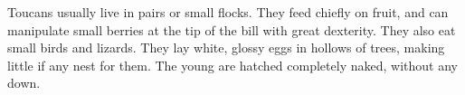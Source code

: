\documentclass{article}
\begin{document}
Toucans usually live in pairs or small flocks. They feed chiefly on
fruit, and can manipulate small berries at the tip of the bill with
great dexterity. They also eat small birds and lizards. They lay white,
glossy eggs in hollows of trees, making little if any nest for them. The
young are hatched completely naked, without any down.
\end{document}
